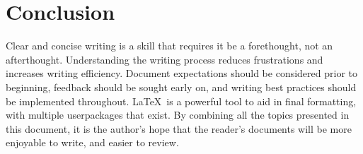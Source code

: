 \section{Conclusion}
Clear and concise writing is a skill that requires it be a forethought, not an afterthought. 
Understanding the writing process reduces frustrations and increases writing efficiency. 
Document expectations should be considered prior to beginning, feedback should be sought early on, and writing best practices should be implemented throughout. 
\LaTeX\ is a powerful tool to aid in final formatting, with multiple userpackages that exist. 
By combining all the topics presented in this document, it is the author's hope that the reader's documents will be more enjoyable to write, and easier to review. 
